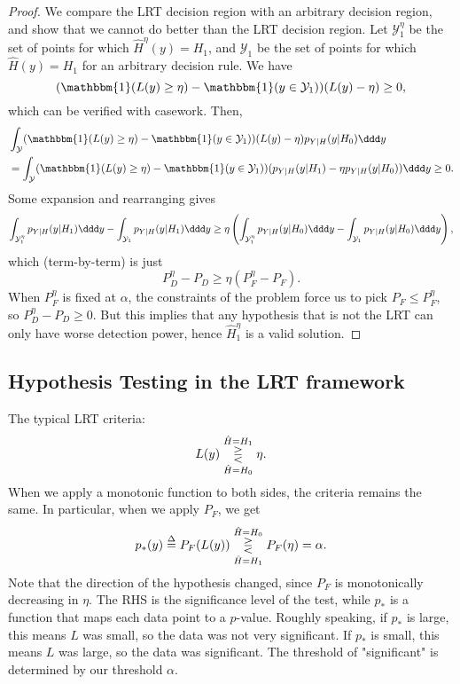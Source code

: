 \begin{proof}
	We compare the LRT decision region with an arbitrary decision region, and show that we cannot do better than the LRT decision region. Let $\mathcal{Y}_1^{\eta}$ be the set of points for which $\hat{H}^{\eta}(y)=H_1$, and $\mathcal{Y}_1$ be the set of points for which $\hat{H}(y)=H_1$ for an arbitrary decision rule. We have 
	\[(\mathbbm{1}(L(y)\geq \eta) - \mathbbm{1}(y\in \mathcal{Y}_1))(L(y)-\eta)\geq 0,\] 
which can be verified with casework. Then, 
\begin{align*}
	&\int_{\mathcal{Y}} (\mathbbm{1}(L(y)\geq \eta) - \mathbbm{1}(y\in \mathcal{Y}_1))(L(y)-\eta)p_{Y|H}(y|H_0) \ddd y \\
	&= \int_{\mathcal{Y}} (\mathbbm{1}(L(y)\geq \eta) - \mathbbm{1}(y\in \mathcal{Y}_1))(p_{Y|H}(y|H_1) - \eta p_{Y|H}(y|H_0))\ddd y\geq 0.
\end{align*}
Some expansion and rearranging gives 
\[\int_{\mathcal{Y}_1^{\eta}}p_{Y|H}(y|H_1)\ddd y - \int_{\mathcal{Y}_1}p_{Y|H}(y|H_1)\ddd y\geq \eta\left(\int_{\mathcal{Y}_1^{\eta}}p_{Y|H}(y|H_0)\ddd y - \int_{\mathcal{Y}_1}p_{Y|H}(y|H_0)\ddd y\right),\]
which (term-by-term) is just 
\[P^{\eta}_D - P_D \geq \eta(P_F^{\eta} - P_F).\] 
When $P_F^{\eta}$ is fixed at $\alpha$, the constraints of the problem force us to pick $P_F\leq P_F^{\eta}$, so $P^{\eta}_D-P_D\geq 0$. But this implies that any hypothesis that is not the LRT can only have worse detection power, hence $\hat{H}^{\eta}_1$ is a valid solution.
\end{proof}

\subsection{Hypothesis Testing in the LRT framework}

The typical LRT criteria:
\[L(y)\overunderset{\hat{H}=H_1}{\hat{H}=H_0}{\gtreqless} \eta.\] 
When we apply a monotonic function to both sides, the criteria remains the same. In particular, when we apply $P_F$, we get
\[p_*(y)\overset{\Delta}{=}P_F(L(y)) \overunderset{\hat{H}=H_0}{\hat{H}=H_1}{\gtreqless} P_F(\eta) = \alpha.\] 
Note that the direction of the hypothesis changed, since $P_F$ is monotonically decreasing in $\eta$. The RHS is the significance level of the test, while $p_*$ is a function that maps each data point to a $p$-value. Roughly speaking, if $p_*$ is large, this means $L$ was small, so the data was not very significant. If $p_*$ is small, this means $L$ was large, so the data was significant. The threshold of "significant" is determined by our threshold $\alpha$. 

